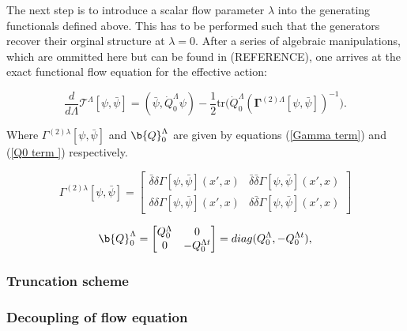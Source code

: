 \documentclass[12pt]{article}
\begin{document}
\noindent The next step is to introduce a scalar flow parameter $\lambda$ into the generating functionals defined above. 
This has to be performed such that the generators recover their orginal structure at $\lambda = 0 $.
After a series of algebraic manipulations, which are ommitted here but can be found in (REFERENCE), one arrives at the exact functional flow equation for the effective action:


\begin{equation} \label{eq:ExactFunctionalFlowEquation}
    \frac{d}{d\Lambda} \mathcal{T}^{\Lambda}[\psi, \bar{\psi}] = (\bar{\psi}, \dot{Q}_0^{\Lambda} \psi) - \frac{1}{2} \text{tr} \big( \dot{Q}_0^{\Lambda} (\boldsymbol{\Gamma}^{(2)\Lambda}[\psi, \bar{\psi}])^{-1} \big).
\end{equation}

\noindent Where $\Gamma^{(2)\lambda}[\psi, \bar{\psi}]$ and  $\b{Q}_0^{\Lambda}$ are given by equations (\ref{Gamma term}) and (\ref{Q0 term }) respectively.



\begin{equation}\label{Gamma term}
\Gamma^{(2)\lambda}[\psi, \bar{\psi}] = 
\begin{bmatrix}
\bar{\delta} \delta \Gamma[\psi, \bar{\psi}](x',x) & \bar{\delta} \bar{\delta} \Gamma[\psi, \bar{\psi}](x',x) \\
\delta \delta \Gamma[\psi, \bar{\psi}](x',x)  & \delta \bar{\delta} \Gamma[\psi, \bar{\psi}](x',x)
\end{bmatrix}
\end{equation}



\begin{equation}\label{Q0 term }
\b{Q}_0^{\Lambda} =
\begin{bmatrix}
Q_0^{\Lambda} & 0 \\
0 & -Q_0^{\Lambda t}
\end{bmatrix}
= diag(Q_0^{\Lambda}, - Q_0^{\Lambda t}),
\end{equation}


\subsubsection{Truncation scheme}
\label{subsubsec:Truncation scheme}
\subsubsection{Decoupling of flow equation}
\end{document}
